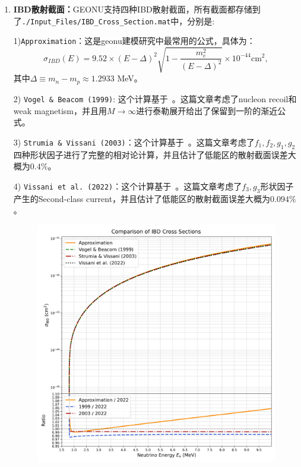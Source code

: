\begin{enumerate}
\begin{figure}[H]
						\end{figure}
					\item \textbf{IBD散射截面：}GEONU支持四种IBD散射截面，所有截面都存储到了\texttt{./Input\_Files/IBD\_Cross\_Section.mat}中，分别是:\par
					1)\texttt{Approximation}：这是geonu建模研究中最常用的公式，具体为：
						\begin{equation}
							\sigma_{IBD}(E)
							= 9.52 \times (E - \Delta)^2 \sqrt{1 - \frac{m_e^2}{(E - \Delta)^2}} \times 10^{-44} \text{cm}^2,
						\end{equation}
					其中$\Delta \equiv m_n - m_p \approx 1.2933$ MeV。\par
					2) \texttt{Vogel \& Beacom (1999)}: 这个计算基于~\cite{IBD-1999}。这篇文章考虑了nucleon recoil和weak magnetism，并且用$M\rightarrow\infty$进行泰勒展开给出了保留到一阶的渐近公式。\par
					3) \texttt{Strumia \& Vissani (2003)}：这个计算基于~\cite{IBD-2003}。这篇文章考虑了$f_1, f_2, g_1, g_2$四种形状因子进行了完整的相对论计算，并且估计了低能区的散射截面误差大概为$0.4\%$。\par 
					4) \texttt{Vissani et al. (2022)}：这个计算基于~\cite{IBD-2022}。这篇文章考虑了$f_3, g_3$形状因子产生的Second-class current，并且估计了低能区的散射截面误差大概为$0.094\%$。
						\begin{figure}[H]
							\centering
							\includegraphics[scale = 0.5]{./Pics/Comparison_of_All_Computed_IBD_Cross_Section.jpg}
						\end{figure}
				\end{enumerate}
